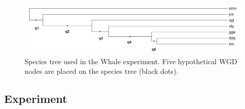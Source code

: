 \begin{figure}
	\centering
	\includegraphics[width=6.5in]{images/whale/whale-tree.png}
	\caption[Species tree of Whale experiment dataset]{Species tree used in the Whale experiment. Five hypothetical WGD nodes are placed on the species tree (black dots).}
    \label{fig:whale-tree}
\end{figure}


\subsection{Experiment}

